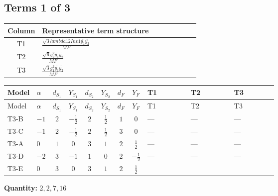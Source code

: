 \documentclass[8pt]{article}
\begin{document}
\begin{landscape}
\subsection*{Terms 1 of 3}
\begin{center}
\begin{tabular}{@{}c >{\raggedright\arraybackslash}p{0.82\linewidth}@{}}
\toprule
Column & Representative term structure \\
\midrule
T1 & \(\displaystyle \frac{\sqrt{3} lambda12Inv1 \overline{y_{1}} \overline{y_{2}}}{MF}\) \\
\midrule
T2 & \(\displaystyle \frac{\sqrt{6} g_{2}^{2} \overline{y_{1}} \overline{y_{2}}}{MF}\) \\
\midrule
T3 & \(\displaystyle \frac{\sqrt{3} g_{1}^{2} \overline{y_{1}} \overline{y_{2}}}{MF}\) \\
\midrule
\bottomrule
\end{tabular}
\end{center}
\smallskip
\tiny
\begin{longtable}{@{}llcccccc >{\raggedright\arraybackslash}p{0.21\linewidth} >{\raggedright\arraybackslash}p{0.21\linewidth} >{\raggedright\arraybackslash}p{0.21\linewidth}@{}}
\toprule
Model & $\alpha$ & $d_{S_1}$ & $Y_{S_1}$ & $d_{S_2}$ & $Y_{S_2}$ & $d_F$ & $Y_F$ & T1 & T2 & T3 \\
\midrule
\endfirsthead
\toprule
Model & $\alpha$ & $d_{S_1}$ & $Y_{S_1}$ & $d_{S_2}$ & $Y_{S_2}$ & $d_F$ & $Y_F$ & T1 & T2 & T3 \\
\midrule
\endhead
T3-B & $-1$ & $2$ & $-\frac{1}{2}$ & $2$ & $\frac{1}{2}$ & $1$ & $0$ & --- & --- & --- \\
\midrule
T3-C & $-1$ & $2$ & $-\frac{1}{2}$ & $2$ & $\frac{1}{2}$ & $3$ & $0$ & --- & --- & --- \\
\midrule
T3-A & $0$ & $1$ & $0$ & $3$ & $1$ & $2$ & $\frac{1}{2}$ & --- & --- & --- \\
\midrule
T3-D & $-2$ & $3$ & $-1$ & $1$ & $0$ & $2$ & $-\frac{1}{2}$ & --- & --- & --- \\
\midrule
T3-E & $0$ & $3$ & $0$ & $3$ & $1$ & $2$ & $\frac{1}{2}$ & \scriptsize\adjustbox{max width=\linewidth}{$\begin{gathered} - \frac{\sqrt{3} lambda12Inv1 \overline{y_{1}} \overline{y_{2}}}{6 MF}\end{gathered}$} & \scriptsize\adjustbox{max width=\linewidth}{$\begin{gathered} \frac{\sqrt{6} g_{2}^{2} \overline{y_{1}} \overline{y_{2}}}{3 MF}\end{gathered}$} & \scriptsize\adjustbox{max width=\linewidth}{$\begin{gathered} \frac{\sqrt{3} g_{1}^{2} \overline{y_{1}} \overline{y_{2}}}{8 MF}\end{gathered}$} \\
\midrule
\bottomrule
\end{longtable}
\clearpage
\noindent\textbf{Quantity: }$\mathrm{2,2,7,16}$\par\smallskip

\end{landscape}
\end{document}
